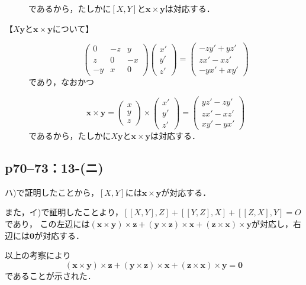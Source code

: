 \begin{tproof}
\begin{description}
\[          \]
          であるから，たしかに$[X,Y]$と$\bm{x} \times \bm{y}$は対応する．
    \item[【$X\bm{y}$と$\bm{x}\times\bm{y}$について】]
          \[
            \begin{pmatrix} 0 & -z & y \\ z & 0 & -x \\ -y & x & 0 \end{pmatrix} \begin{pmatrix} x' \\ y' \\ z' \end{pmatrix} = \begin{pmatrix} -zy'+yz' \\ zx'-xz' \\ -yx'+xy' \end{pmatrix}
          \]
          であり，なおかつ

          \[
            \bm{x}\times \bm{y} = \begin{pmatrix} x \\ y \\ z \end{pmatrix} \times \begin{pmatrix} x' \\ y ' \\ z' \end{pmatrix} = \begin{pmatrix} yz'-zy' \\ zx'-xz' \\ xy'-yx' \end{pmatrix}
          \]
          であるから，たしかに$X\bm{y}$と$\bm{x} \times \bm{y}$は対応する．
  \end{description}
\end{tproof}




\subsection*{p70--73：13-(ニ)}
\begin{tproof}
  ハ)で証明したことから，$[X,Y]$には$\bm{x} \times \bm{y}$が対応する．

  また，イ)で証明したことより，$[[X,Y],Z] +[[Y,Z],X]+[[Z,X],Y]=O$であり，
  この左辺には$(\bm{x}\times\bm{y}) \times \bm{z} + (\bm{y}\times\bm{z}) \times \bm{x} + (\bm{z}\times\bm{x}) \times \bm{y}$が対応し，右辺には$\bm{0}$が対応する．

  以上の考察により
  \[
    (\bm{x}\times\bm{y}) \times \bm{z} + (\bm{y}\times\bm{z}) \times \bm{x} + (\bm{z}\times\bm{x}) \times \bm{y} =\bm{0}
  \]
  であることが示された．
\end{tproof}




